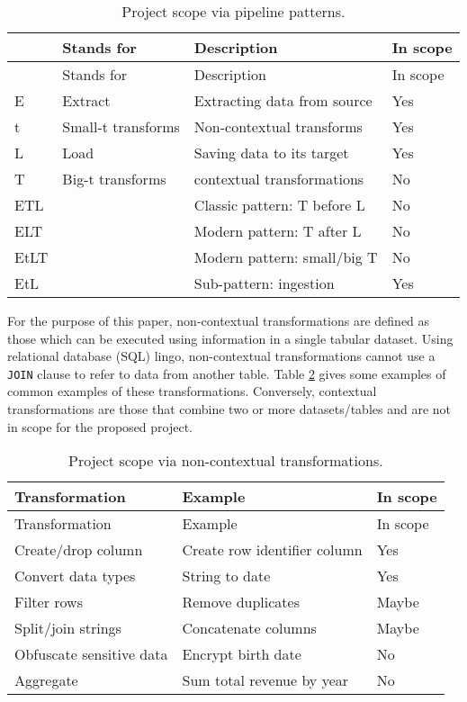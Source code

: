 \begin{longtable}[]{@{}llll@{}}
\caption{\label{tbl:elt}Project scope via pipeline
patterns.}\tabularnewline
\toprule\noalign{}
& Stands for & Description & In scope \\
\midrule\noalign{}
\endfirsthead
\toprule\noalign{}
& Stands for & Description & In scope \\
\midrule\noalign{}
\endhead
\bottomrule\noalign{}
\endlastfoot
E & Extract & Extracting data from source & Yes \\
t & Small-t transforms & Non-contextual transforms & Yes \\
L & Load & Saving data to its target & Yes \\
T & Big-t transforms & contextual transformations & No \\
ETL & & Classic pattern: T before L & No \\
ELT & & Modern pattern: T after L & No \\
EtLT & & Modern pattern: small/big T & No \\
EtL & & Sub-pattern: ingestion & Yes \\
\end{longtable}

For the purpose of this paper, non-contextual transformations are
defined as those which can be executed using information in a single
tabular dataset. Using relational database (SQL) lingo, non-contextual
transformations cannot use a \texttt{JOIN} clause to refer to data from
another table. Table \ref{tbl:tfm} gives some examples of common
examples of these transformations. Conversely, contextual
transformations are those that combine two or more datasets/tables and
are not in scope for the proposed project.

\begin{longtable}[]{@{}lll@{}}
\caption{\label{tbl:tfm}Project scope via non-contextual
transformations.}\tabularnewline
\toprule\noalign{}
Transformation & Example & In scope \\
\midrule\noalign{}
\endfirsthead
\toprule\noalign{}
Transformation & Example & In scope \\
\midrule\noalign{}
\endhead
\bottomrule\noalign{}
\endlastfoot
Create/drop column & Create row identifier column & Yes \\
Convert data types & String to date & Yes \\
Filter rows & Remove duplicates & Maybe \\
Split/join strings & Concatenate columns & Maybe \\
Obfuscate sensitive data & Encrypt birth date & No \\
Aggregate & Sum total revenue by year & No \\
\end{longtable}

